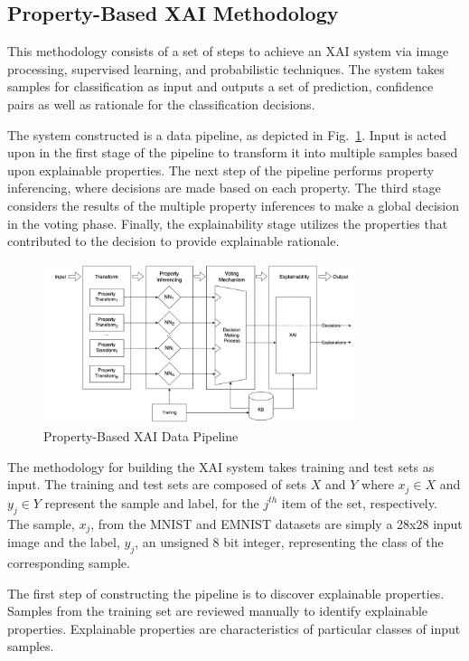 \documentclass[conference]{IEEEtran}
\begin{document}
\subsection{Property-Based XAI Methodology}

This methodology consists of a set of steps to achieve an XAI system via image
processing, supervised learning, and probabilistic techniques. The system takes
samples for classification as input and outputs a set of prediction, confidence
pairs as well as rationale for the classification decisions.

The system constructed is a data pipeline, as depicted in
Fig.~\ref{fig:xai_data_pipeline}.  Input is acted upon in the first stage of the
pipeline to transform it into multiple samples based upon explainable
properties.  The next step of the pipeline performs property inferencing, where
decisions are made based on each property. The third stage considers the results
of the multiple property inferences to make a global decision in the voting
phase. Finally, the explainability stage utilizes the properties that
contributed to the decision to provide explainable rationale.

\begin{figure}
    \includegraphics[width=9.2cm]{./images/xai-pipeline.png}
    \caption{Property-Based XAI Data Pipeline}
    \label{fig:xai_data_pipeline}
\end{figure}

The methodology for building the XAI system takes training and test sets as
input. The training and test sets are composed of sets $X$ and $Y$ where $x_j
\in X$ and $y_j \in Y$ represent the sample and label, for the $j^{th}$ item of
the set, respectively.  The sample, $x_j$, from the MNIST and EMNIST datasets
are simply a 28x28 input image and the label, $y_j$, an unsigned 8 bit integer,
representing the class of the corresponding sample. 

The first step of constructing the pipeline is to discover explainable properties.
Samples from the training set are reviewed manually to identify explainable
properties. Explainable properties are characteristics of particular classes of
input samples.
\end{document}
